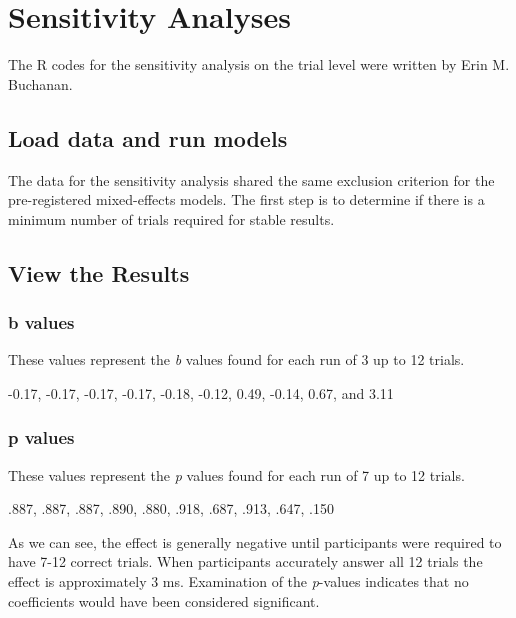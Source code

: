 \documentclass[
  man,mask,floatsintext]{apa7}
\begin{document}
\newpage

\hypertarget{appendix-appendix}{%
\appendix}


\hypertarget{sensitivity-analyses}{%
\section{Sensitivity Analyses}\label{sensitivity-analyses}}

The R codes for the sensitivity analysis on the trial level were written by Erin M. Buchanan.

\hypertarget{load-data-and-run-models}{%
\subsection{Load data and run models}\label{load-data-and-run-models}}

The data for the sensitivity analysis shared the same exclusion criterion for the pre-registered mixed-effects models. The first step is to determine if there is a minimum number of trials required for stable results.

\hypertarget{view-the-results}{%
\subsection{View the Results}\label{view-the-results}}

\hypertarget{b-values}{%
\subsubsection{b values}\label{b-values}}

These values represent the \emph{b} values found for each run of 3 up to 12 trials.

-0.17, -0.17, -0.17, -0.17, -0.18, -0.12, 0.49, -0.14, 0.67, and 3.11

\hypertarget{p-values}{%
\subsubsection{p values}\label{p-values}}

These values represent the \emph{p} values found for each run of 7 up to 12 trials.

.887, .887, .887, .890, .880, .918, .687, .913, .647, .150

As we can see, the effect is generally negative until participants were required to have 7-12 correct trials. When participants accurately answer all 12 trials the effect is approximately 3 ms. Examination of the \emph{p}-values indicates that no coefficients would have been considered significant.
\end{document}
